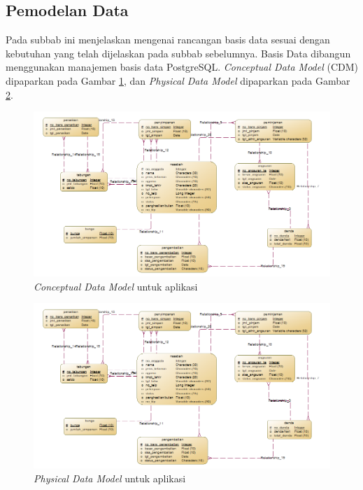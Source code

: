   \subsection{Pemodelan Data}
	\indent Pada subbab ini menjelaskan mengenai rancangan basis data sesuai dengan kebutuhan yang telah dijelaskan pada subbab sebelumnya. Basis Data dibangun menggunakan manajemen basis data PostgreSQL. \textit{Conceptual Data Model} (CDM) dipaparkan pada Gambar \ref{cdm}, dan \textit{Physical Data Model} dipaparkan pada Gambar \ref{pdm}.
      \begin{figure}[H]
        \centering
        \includegraphics[width=\linewidth]{images/bab3/cdm.png}
        \caption{\textit{Conceptual Data Model} untuk aplikasi}
        \label{cdm}
      \end{figure}
      \begin{figure}[H]
        \centering
        \includegraphics[width=\textwidth]{images/bab3/cdm.png}
        \caption{\textit{Physical Data Model} untuk aplikasi}
        \label{pdm}
      \end{figure}
      

